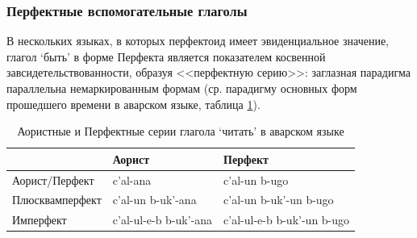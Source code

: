 \subsubsection{Перфектные вспомогательные глаголы} \label{sec:parad}

В нескольких языках, в которых перфектоид имеет эвиденциальное значение, глагол `быть' в форме Перфекта является показателем косвенной завсидетельствованности, образуя <<перфектную серию>>: заглазная парадигма параллельна немаркированным формам (ср. парадигму основных форм прошедшего времени в аварском языке, таблица \ref{tab:pseries}). 
\begin{table}[H]
\caption{Аористные и Перфектные серии глагола `читать' в аварском языке \citep[26]{verhees2018}}
\vspace{0.1cm}
\label{tab:pseries}
\begin{center}
\begin{tabular}{l|ll}
                & Аорист                & Перфект                    \\ \hline
Аорист/Перфект  & c'al-ana              & c'al-un b-ugo              \\
Плюсквамперфект & c'al-un b-uk'-ana     & c'al-un b-uk'-un b-ugo     \\
Имперфект       & c'al-ul-e-b b-uk'-ana & c'al-ul-e-b b-uk'-un b-ugo
\end{tabular}
\end{center}
\end{table}

